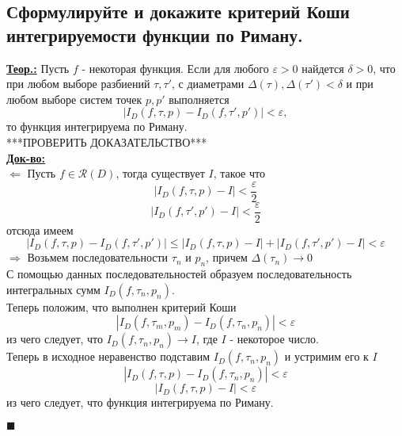 
\subsection{Сформулируйте и докажите критерий Коши интегрируемости функции по Риману.}

\textbf{\underline{Теор.:} } Пусть $f$ - некоторая функция. Если для любого $\varepsilon > 0$ найдется $\delta > 0$, что при любом выборе разбиений $\tau, \tau'$, с диаметрами $\Delta(\tau), \Delta(\tau') < \delta$ и при любом выборе систем точек $p, p'$ выполняется 
\[|I_D(f, \tau, p) - I_D(f, \tau', p')| < \varepsilon,\]
то функция интегрируема по Риману.\\
***ПРОВЕРИТЬ ДОКАЗАТЕЛЬСТВО*** \\
\textbf{\underline{Док-во:} } \\
$\Leftarrow$ Пусть $f \in \mathcal{R}(D)$, тогда существует $I$, такое что 
\[|I_D(f, \tau, p) - I| < \frac{\varepsilon}{2}\]
\[|I_D(f, \tau', p') - I| < \frac{\varepsilon}{2}\]
отсюда имеем
\[|I_D(f, \tau, p) - I_D(f, \tau', p')| \leq |I_D(f, \tau, p) - I| + |I_D(f, \tau', p') - I| < \varepsilon\]
$\Rightarrow$ Возьмем последовательности $\tau_n$ и $p_n$, причем $\Delta(\tau_n) \rightarrow 0$ \\
С помощью данных последовательностей образуем последовательность интегральных сумм $I_D(f, \tau_n, p_n)$. \\
Теперь положим, что выполнен критерий Коши
\[|I_D(f, \tau_m, p_m) - I_D(f, \tau_n, p_n)| < \varepsilon\]
из чего следует, что $I_D(f, \tau_n, p_n) \rightarrow I$, где $I$ - некоторое число. \\
Теперь в исходное неравенство подставим $I_D(f, \tau_n, p_n)$ и устримим его к $I$
\[|I_D(f, \tau, p) - I_D(f, \tau_n, p_n)| < \varepsilon\]
\[|I_D(f, \tau, p) - I| < \varepsilon\] 
из чего следует, что функция интегрируема по Риману.
\begin{flushright}
$\blacksquare$
\end{flushright}


